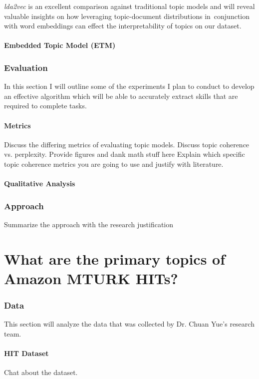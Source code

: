 \documentclass[letterpaper,12pt]{article}
\begin{document}
\emph{lda2vec} is an excellent comparison against traditional topic models and will reveal valuable insights on how leveraging topic-document distributions in\
conjunction with word embeddings can effect the interpretability of topics on our dataset.

\subsubsection{Embedded Topic Model (ETM)}
\subsection{Evaluation}
In this section I will outline some of the experiments I plan to conduct to develop an effective algorithm which
will be able to accurately extract skills that are required to complete tasks.

\subsubsection{Metrics}
Discuss the differing metrics of evaluating topic models. Discuss topic coherence vs. perplexity.
Provide figures and dank math stuff here
Explain which specific topic coherence metrics you are going to use and justify with literature.

\subsubsection{Qualitative Analysis}
\subsection{Approach}
Summarize the approach with the research justification

\chapter{What are the primary topics of Amazon MTURK HITs?}

\subsection{Data}
This section will analyze the data that was collected by Dr. Chuan Yue's research team.

\subsubsection{HIT Dataset}
Chat about the dataset.
\end{document}
